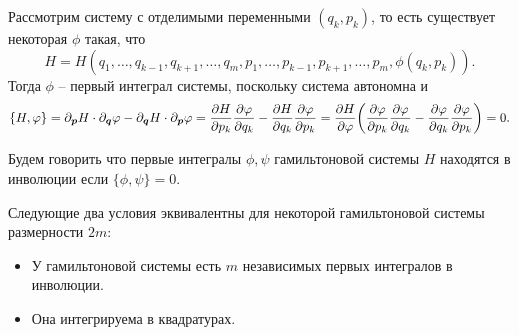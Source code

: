 Рассмотрим систему с отделимыми переменными $(q_k, p_k)$, то есть существует некоторая $\phi$ такая, что
\[
    H = H(q_1, \ldots, q_{k - 1}, q_{k + 1}, \ldots, q_m, p_1, \ldots, p_{k - 1}, p_{k + 1}, \ldots, p_m, \phi(q_k, p_k)).
\]
Тогда $\phi$ -- первый интеграл системы, поскольку система автономна и
\[
    \{H, \varphi\} = \partial_{\boldsymbol{p}} H \cdot \partial_{\boldsymbol{q}} \varphi - \partial_{\boldsymbol{q}} H \cdot \partial_{\boldsymbol{p}} \varphi = \dfrac{\partial H}{\partial p_k}\dfrac{\partial \varphi}{\partial q_k} - \dfrac{\partial H}{\partial q_k}\dfrac{\partial \varphi}{\partial p_k} = \dfrac{\partial H}{\partial \varphi}\biggr(\dfrac{\partial \varphi}{\partial p_k} \dfrac{\partial \varphi}{\partial q_k} - \dfrac{\partial \varphi}{\partial q_k} \dfrac{\partial \varphi}{\partial p_k}\biggr) = 0.
\]
\begin{definition}
    Будем говорить что первые интегралы $\phi, \psi$ гамильтоновой системы $H$ находятся в инволюции если $\{\phi, \psi\} = 0$.
\end{definition}
\begin{theorem}
    Следующие два условия эквивалентны для некоторой гамильтоновой системы размерности $2m$:
    \begin{itemize}
        \item У гамильтоновой системы есть $m$ независимых первых интегралов в инволюции.
        \item Она интегрируема в квадратурах.
    \end{itemize}
\end{theorem}
